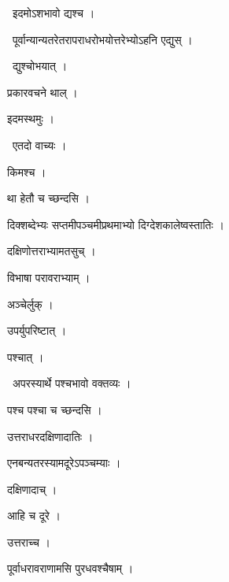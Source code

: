 \documentclass[10pt, openany, oneside]{book}
\begin{document}
\par\noindent\hspace{1.5em}{\vps वा॰}~{\qt इदमोऽशभावो द्यश्च ।}

\par\noindent\hspace{1.5em}{\vps वा॰}~{\qt पूर्वान्यान्यतरेतरापराधरोभयोत्तरेभ्योऽहनि एद्युस् ।}

\par\noindent\hspace{1.5em}{\vps वा॰}~{\qt द्युश्चोभयात् ।}

\noindent प्रकारवचने थाल् ।

\noindent इदमस्थमुः ।

\par\noindent\hspace{1.5em}{\vps वा॰}~{\qt एतदो वाच्यः ।}

\noindent किमश्च ।

\noindent था हेतौ च च्छन्दसि ।

\noindent दिक्शब्देभ्यः सप्तमीपञ्चमीप्रथमाभ्यो दिग्देशकालेष्वस्तातिः ।

\noindent दक्षिणोत्तराभ्यामतसुच् ।

\noindent विभाषा परावराभ्याम् ।

\noindent अञ्चेर्लुक् ।

\noindent उपर्युपरिष्टात् ।

\noindent पश्चात् ।

\par\noindent\hspace{1.5em}{\vps वा॰}~{\qt अपरस्यार्थे पश्चभावो वक्तव्यः ।}

\noindent पश्च पश्चा च च्छन्दसि ।

\noindent उत्तराधरदक्षिणादातिः ।

\noindent एनबन्यतरस्यामदूरेऽपञ्चम्याः ।

\noindent दक्षिणादाच् ।

\noindent आहि च दूरे ।

\noindent उत्तराच्च ।

\noindent पूर्वाधरावराणामसि पुरधवश्चैषाम् ।
\end{document}
